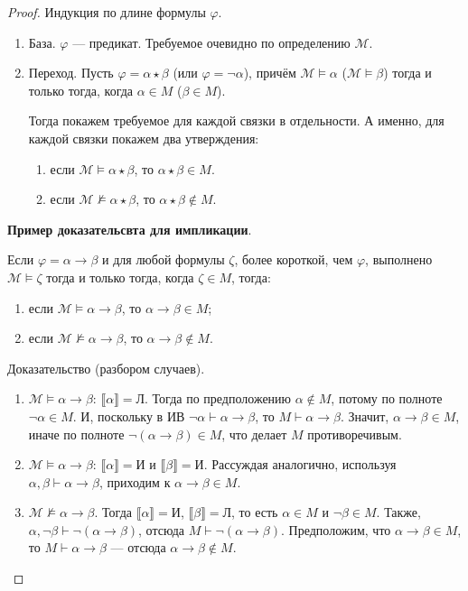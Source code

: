 \begin{proof}Индукция по длине формулы $\varphi$.
    \begin{enumerate}
    \item База. $\varphi$ --- предикат. Требуемое очевидно по определению $\mathcal{M}$.
    \item Переход. Пусть $\varphi = \alpha\star\beta$ (или $\varphi=\neg\alpha$), причём $\mathcal{M}\models\alpha$ ($\mathcal{M}\models\beta$)
       тогда и только тогда, когда $\alpha\in M$ ($\beta\in M$).

    Тогда покажем требуемое для каждой связки в отдельности. А именно, для каждой связки покажем два утверждения:
    \begin{enumerate}
    \item если $\mathcal{M}\models\alpha\star\beta$, то $\alpha\star\beta \in M$.

    \item если $\mathcal{M}\not\models\alpha\star\beta$, то $\alpha\star\beta \not\in M$.
    \end{enumerate}
    \end{enumerate}

    \textbf{Пример доказательсвта для импликации}.

    Если $\varphi = \alpha\to\beta$ и для любой формулы $\zeta$, более короткой, чем $\varphi$, выполнено
    $\mathcal{M}\models\zeta$ тогда и только тогда, когда $\zeta\in M$, тогда:
    \begin{enumerate}
    \item если $\mathcal{M}\models\alpha\to\beta$, то $\alpha\to\beta\in M$;
    \item если $\mathcal{M}\not\models\alpha\to\beta$, то $\alpha\to\beta\notin M$.
    \end{enumerate}

    Доказательство (разбором случаев).
    \begin{enumerate}
    \item $\mathcal{M}\models\alpha\to\beta$: $\llbracket\alpha\rrbracket = \text{Л}$.
    Тогда по предположению $\alpha\notin M$, потому по полноте
    $\neg\alpha\in M$.  И, поскольку в ИВ $\neg\alpha\vdash\alpha\to\beta$, то $M \vdash \alpha\to\beta$.
    Значит, $\alpha\to\beta \in M$, иначе по полноте $\neg(\alpha\to\beta) \in M$, что делает $M$ противоречивым.
    \item $\mathcal{M}\models\alpha\to\beta$: $\llbracket\alpha\rrbracket = \text{И}$ и $\llbracket\beta\rrbracket = \text{И}$. Рассуждая аналогично,
    используя $\alpha,\beta\vdash\alpha\to\beta$, приходим к $\alpha\to\beta \in M$.
    \item $\mathcal{M}\not\models\alpha\to\beta$. Тогда $\llbracket\alpha\rrbracket=\text{И}$,
    $\llbracket\beta\rrbracket=\text{Л}$,  то есть $\alpha\in M$ и $\neg\beta\in M$.
    Также, $\alpha,\neg\beta\vdash\neg(\alpha\to\beta)$, отсюда $M\vdash\neg(\alpha\to\beta)$.
    Предположим, что $\alpha\to\beta\in M$, то $M\vdash\alpha\to\beta$ --- отсюда
    $\alpha\to\beta\notin M$.
    \end{enumerate}
\end{proof}

